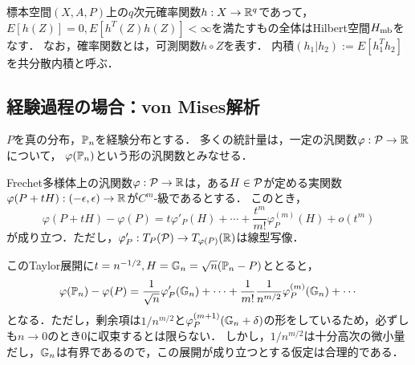 \documentclass[uplatex,dvipdfmx]{jsreport}
\begin{document}
\begin{example}
    標本空間$(X,A,P)$上の$q$次元確率関数$h:X\to\R^q$であって，$E[h(Z)]=0,E[h^T(Z)h(Z)]<\infty$を満たすもの全体はHilbert空間$H_\mb$をなす．
    なお，確率関数とは，可測関数$h\circ Z$を表す．
    内積$(h_1|h_2):=E[h_1^Th_2]$を共分散内積と呼ぶ．
\end{example}

\subsection{経験過程の場合：von Mises解析}

\begin{tcolorbox}[colframe=ForestGreen, colback=ForestGreen!10!white,breakable,colbacktitle=ForestGreen!40!white,coltitle=black,fonttitle=\bfseries\sffamily,
title=]
    $P$を真の分布，$\bP_n$を経験分布とする．
    多くの統計量は，一定の汎関数$\varphi:\P\to\R$について，
    $\varphi(\bP_n)$という形の汎関数とみなせる．
\end{tcolorbox}

\begin{theorem}[復習：Taylorの定理]
    Frechet多様体上の汎関数$\varphi:\P\to\R$は，ある$H\in\P$が定める実関数$\varphi(P+tH):(-\ep,\ep)\to\R$が$C^m$-級であるとする．
    このとき，
    \[\varphi(P+tH)-\varphi(P)=t\varphi'_P(H)+\cdots+\frac{t^m}{m!}\varphi^{(m)}_P(H)+o(t^m)\]
    が成り立つ．ただし，$\varphi'_P:T_P(\P)\to T_{\varphi(P)}(\R)$は線型写像．
\end{theorem}
\begin{remarks}
    このTaylor展開に$t=n^{-1/2},H=\bG_n=\sqrt{n}(\bP_n-P)$ととると，
    \[\varphi(\bP_n)-\varphi(P)=\frac{1}{\sqrt{n}}\varphi'_P(\bG_n)+\cdots+\frac{1}{m!}\frac{1}{n^{m/2}}\varphi^{(m)}_P(\bG_n)+\cdots\]
    となる．ただし，剰余項は$1/n^{m/2}$と$\varphi^{(m+1)}_P(\bG_n+\delta)$の形をしているため，必ずしも$n\to0$のとき$0$に収束するとは限らない．
    しかし，$1/n^{m/2}$は十分高次の微小量だし，$\bG_n$は有界であるので，この展開が成り立つとする仮定は合理的である．
\end{remarks}
\end{document}

